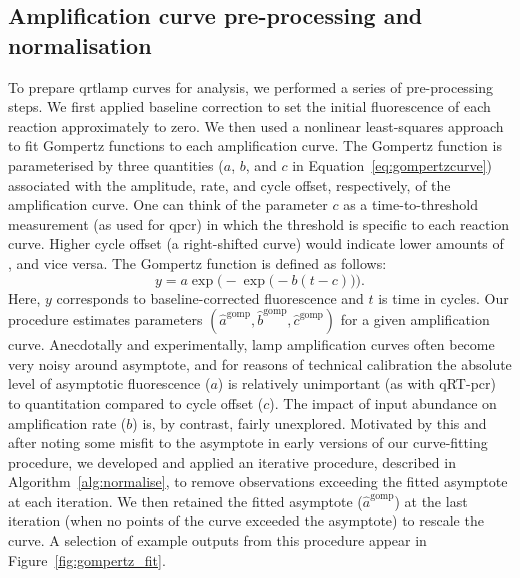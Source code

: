 \documentclass[../thesis.tex]{subfiles}
\begin{document}
\subsection{Amplification curve pre-processing and normalisation \label{sec:curvenormalisation}}
To prepare \gls{qrtlamp} curves for analysis, we performed a series of pre-processing steps. We first applied baseline correction to set the initial fluorescence of each reaction approximately to zero. 
We then used a nonlinear least-squares approach to fit Gompertz functions to each amplification curve. The Gompertz function is parameterised by three quantities ($a$, $b$, and $c$ in Equation~\ref{eq:gompertzcurve}) associated with the amplitude, rate, and cycle offset, respectively, of the amplification curve. One can think of the parameter $c$ as a time-to-threshold measurement (as used for \gls{qpcr}) in which the threshold is specific to each reaction curve. Higher cycle offset (a right-shifted curve) would indicate lower amounts of , and vice versa. The Gompertz function is defined as follows:
\begin{equation} \label{eq:gompertzcurve}
    y = a \exp\Big(-\exp\big( -b (t - c)\big)\Big).
\end{equation}
Here, $y$ corresponds to baseline-corrected fluorescence and $t$ is time in cycles. Our procedure estimates parameters $(\hat{a}^{\text{gomp}}, \hat{b}^{\text{gomp}}, \hat{c}^{\text{gomp}})$ for a given amplification curve. Anecdotally and experimentally, \gls{lamp} amplification curves often become very noisy around asymptote, and for reasons of technical calibration the absolute level of asymptotic fluorescence ($a$) is relatively unimportant (as with qRT-\gls{pcr}) to quantitation compared to cycle offset ($c$). The impact of input  abundance on amplification rate ($b$) is, by contrast, fairly unexplored.
 Motivated by this and after noting some misfit to the asymptote in early versions of our curve-fitting procedure, we developed and applied an iterative procedure, described in Algorithm~\ref{alg:normalise}, to remove observations exceeding the fitted asymptote at each iteration. We then retained the fitted asymptote ($\hat{a}^{\text{gomp}}$) at the last iteration (when no points of the curve exceeded the asymptote) to rescale the curve. A selection of example outputs from this procedure appear in Figure~\ref{fig:gompertz_fit}.
\end{document}
